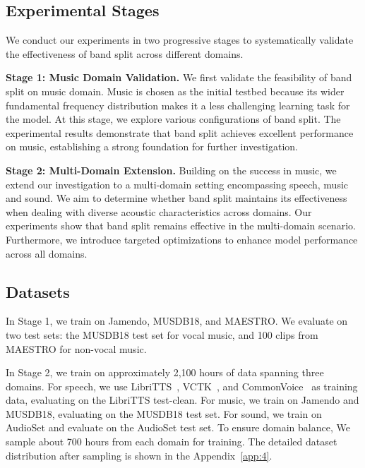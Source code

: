 \documentclass[11pt]{article}
\begin{document}
\subsection{Experimental Stages}
We conduct our experiments in two progressive stages to systematically validate the effectiveness of band split across different domains.

\noindent\textbf{Stage 1: Music Domain Validation.} We first validate the feasibility of band split on music domain. Music is chosen as the initial testbed because its wider fundamental frequency distribution makes it a less challenging learning task for the model. At this stage, we explore various configurations of band split. The experimental results demonstrate that band split achieves excellent performance on music, establishing a strong foundation for further investigation.

\noindent\textbf{Stage 2: Multi-Domain Extension.} Building on the success in music, we extend our investigation to a multi-domain setting encompassing speech, music and sound. We aim to determine whether band split maintains its effectiveness when dealing with diverse acoustic characteristics across domains. Our experiments show that band split remains effective in the multi-domain scenario. Furthermore, we introduce targeted optimizations to enhance model performance across all domains.


\subsection{Datasets}
In Stage 1, we train on Jamendo\cite{bogdanov2019mtg}, MUSDB18\cite{musdb18}, and MAESTRO\cite{hawthorne2018enabling}. We evaluate on two test sets: the MUSDB18 test set for vocal music, and 100 clips from MAESTRO for non-vocal music.

In Stage 2, we train on approximately 2,100 hours of data spanning three domains. For speech, we use LibriTTS~\cite{zen2019libritts}, VCTK~\cite{yamagishi2019vctk}, and CommonVoice~\cite{ardila2019common} as training data, evaluating on the LibriTTS test-clean. For music, we train on Jamendo\cite{bogdanov2019mtg} and MUSDB18\cite{musdb18}, evaluating on the MUSDB18 test set. For sound, we train on AudioSet\cite{gemmeke2017audio} and evaluate on the AudioSet test set. To ensure domain balance, We sample about 700 hours from each domain for training. The detailed dataset distribution after sampling is shown in the Appendix~\ref{app:4}.
\end{document}
